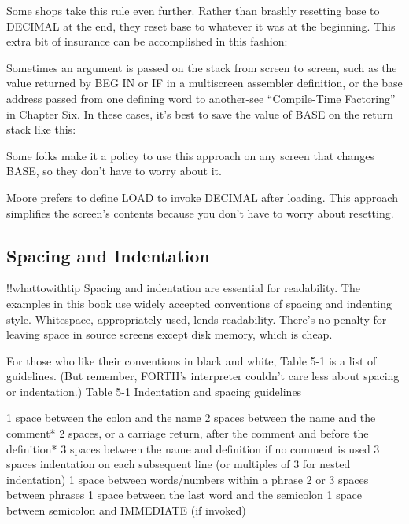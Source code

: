 Some shops take this rule even further.  Rather than brashly resetting
base to DECIMAL at the end, they reset base to whatever it was
at the beginning.  This extra bit of insurance can be accomplished in this
fashion:

Sometimes an argument is passed on the stack from screen to screen,
such as the value returned by BEG IN or IF in a multiscreen assembler
definition, or the base address passed from one defining word to
another-see ``Compile-Time Factoring'' in Chapter Six.  In these cases,
it's best to save the value of BASE on the return stack like this:

Some folks make it a policy to use this approach on any screen that
changes BASE, so they don't have to worry about it.

Moore prefers to define LOAD to invoke DECIMAL after loading.
This approach simplifies the screen's contents because you don't have to
worry about resetting.

\subsection{Spacing and Indentation}

!!whattowithtip{
Spacing and indentation are essential for readability.
}
The examples in this book use widely accepted conventions of spacing
and indenting style.  Whitespace, appropriately used, lends readability.
There's no penalty for leaving space in source screens except disk
memory, which is cheap.

For those who like their conventions in black and white, Table 5-1 is
a list of guidelines.  (But remember, FORTH's interpreter couldn't care
less about spacing or indentation.)
Table 5-1 Indentation and spacing guidelines

1 space between the colon and the name
2 spaces between the name and the comment*
2 spaces, or a carriage return, after the comment and before the definition*
3 spaces between the name and definition if no comment is used
3 spaces indentation on each subsequent line (or multiples of 3 for nested
indentation)
1 space between words/numbers within a phrase
2 or 3 spaces between phrases
1 space between the last word and the semicolon
1 space between semicolon and IMMEDIATE (if invoked)

